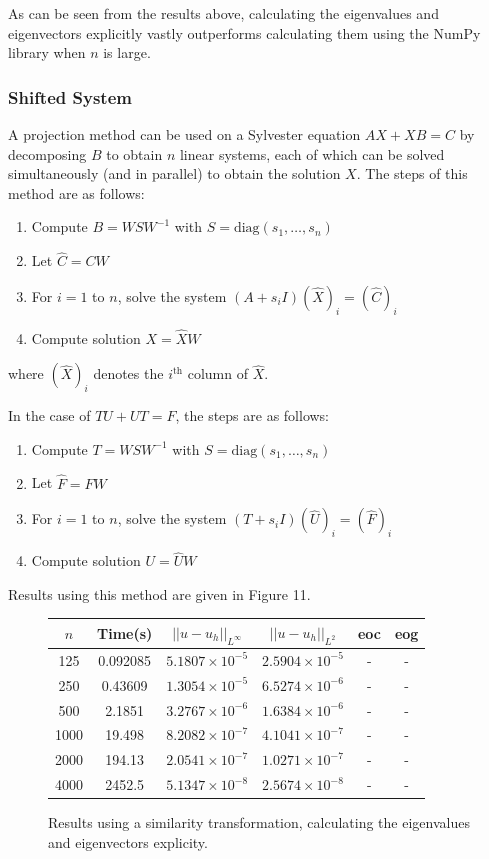 \documentclass{article}
\numberwithin{equation}{section}
\begin{document}
As can be seen from the results above, calculating the eigenvalues and eigenvectors explicitly vastly outperforms calculating them using the NumPy library when $n$ is large.

\subsubsection{Shifted System}
A projection method \cite{Simoncini} can be used on a Sylvester equation $AX + XB =C$ by decomposing $B$ to obtain $n$ linear systems, each of which can be solved simultaneously (and in parallel) to obtain the solution $X$. The steps of this method are as follows:
\begin{enumerate}
\item Compute $B = WSW^{-1}$ with $S = \text{diag}(s_1, \dots, s_n)$
\item Let $\hat{C} = CW$
\item For $i=1$ to $n$, solve the system $(A+s_i I)(\hat{X})_i = (\hat{C})_i$
\item Compute solution $X = \hat{X}W$
\end{enumerate}
where $(\hat{X})_i$ denotes the $i^{\text{th}}$ column of $\hat{X}$.

In the case of $TU + UT = F$, the steps are as follows:
\begin{enumerate}
\item Compute $T = WSW^{-1}$ with $S = \text{diag}(s_1, \dots, s_n)$
\item Let $\hat{F} = FW$
\item For $i=1$ to $n$, solve the system $(T+s_i I)(\hat{U})_i = (\hat{F})_i$
\item Compute solution $U = \hat{U}W$
\end{enumerate}

Results using this method are given in Figure 11.
\begin{figure}[H]
\centering
\begin{tabular}{|c|c|c|c|c|c|}
\hline
$n$ & Time(s) & $|| u - u_h ||_{L^{\infty}}$ &$|| u - u_h ||_{L^{2}}$ & eoc & eog \\
\hline
125 & 0.092085 & $5.1807 \times 10^{-5}$ & $2.5904 \times 10^{-5}$ & - & -  \\
250 & 0.43609 & $1.3054 \times 10^{-5}$ & $6.5274 \times 10^{-6}$ & - & -  \\
500 & 2.1851 & $3.2767 \times 10^{-6}$ & $1.6384 \times 10^{-6}$ & - & -  \\
1000 & 19.498 & $8.2082 \times 10^{-7}$ & $4.1041 \times 10^{-7}$ & - & -  \\
2000 & 194.13 & $2.0541 \times 10^{-7}$ & $1.0271 \times 10^{-7}$ & - & -  \\
4000 & 2452.5 & $5.1347 \times 10^{-8}$ & $2.5674 \times 10^{-8}$ & - & -  \\
\hline
\end{tabular}
\captionsetup{justification=centering}
\caption{Results using a similarity transformation, calculating the eigenvalues and eigenvectors explicity.}
\end{figure}
\end{document}
